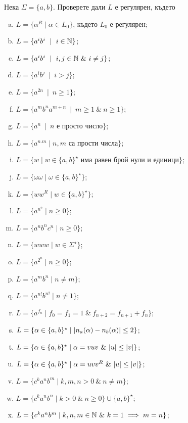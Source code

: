 \begin{problem}
  Нека $\Sigma = \{a,b\}$.  Проверете дали $L$ е регулярен, където
  \begin{enumerate}[a)]
  \item
    $L = \{\alpha^R \mid \alpha \in L_0\}$, където $L_0$ е регулярен;
  \item
    $L = \{a^ib^i\ \mid\ i\in\Nat\}$;
  \item
    $L = \{a^ib^i\ \mid\ i,j\in\Nat\ \&\ i\neq j\}$;
  \item
    $L = \{a^ib^j\ \mid\ i > j\}$;
  \item
    $L = \{a^{2n}\ \mid\ n\geq 1\}$;
  \item
    $L = \{a^mb^na^{m+n}\ \mid\ m\geq 1\ \&\ n\geq 1\}$;
  \item
    $L = \{a^n\ \mid\ n\mbox{ е просто число}\}$;
  \item
    $L = \{a^{n.m}\mid n,m\mbox{ са прости числа}\}$;
  \item
    $L = \{w\mid w\in\{a,b\}^\star\mbox{ има равен брой нули и единици}\}$;
  \item
    $L = \{\omega\omega\mid \omega\in\{a,b\}^\star\}$;
  \item
    $L = \{ww^R\mid w\in\{a,b\}^\star\}$;
  \item
    $L= \{a^{n^2}\mid n\geq 0\}$;
  \item
    $L = \{a^nb^nc^n\mid n\geq 0\}$;
  \item
    $L = \{www\mid w\in \Sigma^\star\}$;
  \item
    $L = \{a^{2^n}\mid n\geq 0\}$;
  \item
    $L = \{a^mb^n\mid n\neq m\}$;
  \item
    $L = \{a^{n!}b^{n!}\mid n\neq 1\}$;
  \item
    $L = \{a^{f_n} \mid f_0 = f_1 = 1\ \&\ f_{n+2} = f_{n+1} + f_{n}\}$;
  \item
    $L = \{\alpha \in \{a,b\}^\star \mid \vert{n_a(\alpha) - n_b(\alpha)}\vert \leq 2\}$;
  \item
    $L = \{\alpha \in \{a,b\}^\star \mid \alpha = vuv\ \&\ \vert{u}\vert \leq \vert{v}\vert\}$;
  \item
    $L = \{\alpha \in \{a,b\}^\star \mid \alpha = uvv^R\ \&\ \vert{u}\vert \leq \vert{v}\vert\}$;
  \item
    $L = \{c^ka^nb^m \mid k,m,n > 0\ \&\ n \neq m\}$;
  \item
    $L = \{c^ka^nb^n \mid k > 0\ \&\ n \geq 0\}\cup\{a,b\}^\star$;
  \item
    $L = \{c^ka^nb^m\mid k,n,m \in \Nat\ \&\ k = 1\implies m = n\}$; %
  \end{enumerate}
\end{problem}
